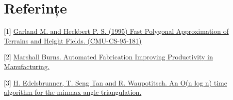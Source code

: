 \documentclass[12pt]{article}
\begin{document}
\section*{Referințe}

\medskip

[1] \href{http://reports-archive.adm.cs.cmu.edu/anon/anon/home/ftp/1995/CMU-CS-95-181.pdf} {Garland M. and Heckbert P. S. (1995) Fast Polygonal Approximation of Terrains and Height Fields. (CMU-CS-95-181)}

[2] \href{https://www.fabbers.com/tech/STL_Format#Sct_binary} {Marshall Burns. Automated Fabrication
Improving Productivity in Manufacturing.}

[3] \href{http://www.comp.nus.edu.sg/~tants/Paper/mma.pdf} {H. Edelsbrunner, T. Seng Tan and R. Waupotitsch. An O(n log n) time algorithm for the minmax angle triangulation.}
\end{document}
